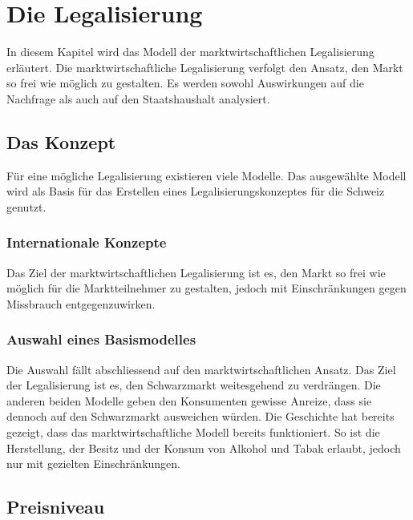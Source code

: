 \documentclass[../main.tex]{subfiles}
\begin{document}
	 \section{Die Legalisierung}
	 
	 In diesem Kapitel wird das Modell der marktwirtschaftlichen Legalisierung erläutert. 
	 Die marktwirtschaftliche Legalisierung verfolgt den Ansatz, den Markt so frei wie möglich zu gestalten. 
	 Es werden sowohl Auswirkungen auf die Nachfrage als auch auf den Staatshaushalt analysiert. 
	 
	 \subsection{Das Konzept}
	 Für eine mögliche Legalisierung existieren viele Modelle. 
	 Das ausgewählte Modell wird als Basis für das Erstellen eines Legalisierungskonzeptes für die Schweiz genutzt.
	 
	 \subsubsection{Internationale Konzepte}
	 
	 Das Ziel der marktwirtschaftlichen Legalisierung ist es, den Markt so frei wie möglich für die Marktteilnehmer zu gestalten, jedoch mit Einschränkungen gegen Missbrauch entgegenzuwirken.
	 
	 \subsubsection{Auswahl eines Basismodelles}
	 Die Auswahl fällt abschliessend auf den marktwirtschaftlichen Ansatz. 
	 Das Ziel der Legalisierung ist es, den Schwarzmarkt weitesgehend zu verdrängen.
	 Die anderen beiden Modelle geben den Konsumenten gewisse Anreize, dass sie dennoch auf den Schwarzmarkt ausweichen würden. 
	 Die Geschichte hat bereits gezeigt, dass das marktwirtschaftliche Modell bereits funktioniert.
	 So ist die Herstellung, der Besitz und der Konsum von Alkohol und Tabak erlaubt, jedoch nur mit gezielten Einschränkungen.
	 
	 
	 \subsection{Preisniveau}
	 
\end{document}
